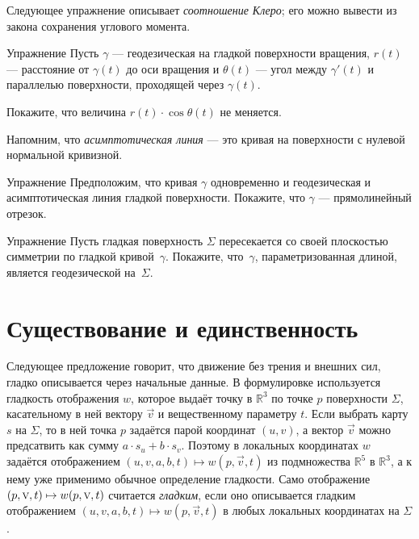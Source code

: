 {\sloppy

Следующее упражнение описывает \emph{соотношение Клеро};
его можно вывести из закона сохранения углового момента.

}

\begin{thm}{Упражнение}\label{ex:clairaut}
Пусть $\gamma$ --- геодезическая на гладкой поверхности вращения,
$r(t)$ --- расстояние от $\gamma(t)$ до оси вращения
и $\theta(t)$ --- угол между $\gamma'(t)$ и параллелью поверхности, проходящей через $\gamma(t)$. 

Покажите, что величина $r(t)\cdot \cos\theta(t)$ не меняется. 
\end{thm}

Напомним, что {}\emph{асимптотическая линия} --- это кривая на поверхности с нулевой нормальной кривизной.

\begin{thm}{Упражнение}\label{ex:asymptotic-geodesic}
Предположим, что кривая $\gamma$ одновременно и геодезическая и асимптотическая линия гладкой поверхности.
Покажите, что $\gamma$ --- прямолинейный отрезок.
\end{thm}

\begin{thm}{Упражнение}\label{ex:reflection-geodesic}
Пусть гладкая поверхность $\Sigma$ пересекается со своей плоскостью симметрии по гладкой кривой~$\gamma$.
Покажите, что~$\gamma$, параметризованная длиной, является геодезической на~$\Sigma$.
\end{thm}

\section{Существование и единственность}

{\sloppy

Следующее предложение говорит, что движение без трения и внешних сил, гладко описывается через начальные данные.
В формулировке используется гладкость отображения $w$, которое выдаёт точку в $\mathbb{R}^3$ по точке $p$ поверхности $\Sigma$, касательному в ней вектору $\vec{v}$ и вещественному параметру $t$.
Если выбрать карту $s$ на $\Sigma$, то в ней точка $p$ задаётся парой координат $(u,v)$, а вектор $\vec{v}$ можно предсатвить как сумму $a\cdot s_u+b\cdot s_v$.
Поэтому в локальных координатах $w$ задаётся отображением $(u,v,a,b,t)\mapsto w(p,\vec v,t)$ из подмножества $\mathbb{R}^5$ в $\mathbb{R}^3$, а к нему уже применимо обычное определение гладкости.
Само отображение $(p,\vec v, t)\z\mapsto w(p,\vec v, t)$ считается \emph{гладким}, если оно описывается гладким отображением $(u,v,a,b,t)\mapsto w(p,\vec v,t)$ в любых локальных координатах на $\Sigma$.

}

